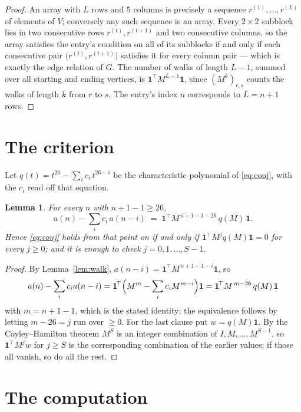 \documentclass[11pt,a4paper]{article}
\theoremstyle{plain}
\newtheorem{lemma}[theorem]{Lemma}
\theoremstyle{definition}
\begin{document}
\begin{proof}
An array with $L$ rows and $5$ columns is precisely a sequence
$r^{(1)},\dots,r^{(L)}$ of elements of $V$; conversely any such sequence is an array.
Every $2\times2$ subblock lies in two consecutive rows $r^{(t)},r^{(t+1)}$ and two
consecutive columns, so the array satisfies the entry's condition on all of its subblocks
if and only if each consecutive pair $\bigl(r^{(t)},r^{(t+1)}\bigr)$ satisfies it for
every column pair --- which is exactly the edge relation of $G$. The number of walks of
length $L-1$, summed over all starting and ending vertices, is
$\mathbf{1}^{\!\top}M^{L-1}\mathbf{1}$, since $(M^{k})_{r,s}$ counts the walks of
length $k$ from $r$ to $s$. The entry's index $n$ corresponds to $L=n+1$ rows.
\end{proof}

\section{The criterion}

Let $q(t)=t^{26}-\sum_i c_i\,t^{26-i}$ be the characteristic polynomial of
\eqref{eq:conj}, with the $c_i$ read off that equation.

\begin{lemma}\label{lem:crit}
For every $n$ with $n+1-1\ge26$,
\[
a(n)-\sum_i c_i\,a(n-i)\;=\;\mathbf{1}^{\!\top}M^{\,n+1-1-26}\,q(M)\,\mathbf{1} .
\]
Hence \eqref{eq:conj} holds from that point on if and only if
$\mathbf{1}^{\!\top}M^{j}q(M)\mathbf{1}=0$ for every $j\ge0$; and it is enough to check
$j=0,1,\dots,S-1$.
\end{lemma}

\begin{proof}
By Lemma~\ref{lem:walk}, $a(n-i)=\mathbf{1}^{\!\top}M^{\,n+1-1-i}\mathbf{1}$, so
\[
a(n)-\sum_i c_i a(n-i)
=\mathbf{1}^{\!\top}\Bigl(M^{m}-\sum_i c_i M^{m-i}\Bigr)\mathbf{1}
=\mathbf{1}^{\!\top}M^{\,m-26}\,q(M)\,\mathbf{1}
\]
with $m=n+1-1$, which is the stated identity; the equivalence follows by letting
$m-26=j$ run over $\ge0$. For the last clause put $w=q(M)\mathbf{1}$. By the
Cayley--Hamilton theorem $M^{S}$ is an integer combination of $I,M,\dots,M^{S-1}$, so
$\mathbf{1}^{\!\top}M^{j}w$ for $j\ge S$ is the corresponding combination of the earlier
values; if those all vanish, so do all the rest.
\end{proof}

\section{The computation}
\end{document}
